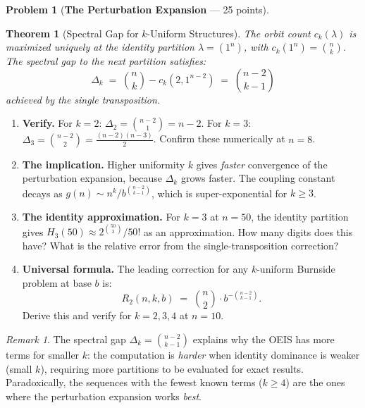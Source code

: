 \documentclass[11pt,letterpaper]{article}
\newtheorem{theorem}{Theorem}
\theoremstyle{definition}
\newtheorem{problem}{Problem}
\theoremstyle{remark}
\newtheorem*{remark}{Remark}
\begin{document}
\bigskip


\begin{problem}[\textbf{The Perturbation Expansion} --- 25 points]\label{prob:perturbation}

\begin{theorem}[Spectral Gap for $k$-Uniform Structures]\label{thm:gap-k}
The orbit count $c_k(\lambda)$ is maximized uniquely at the identity partition $\lambda = (1^n)$, with $c_k(1^n) = \binom{n}{k}$. The spectral gap to the next partition satisfies:
\[
\Delta_k \;=\; \binom{n}{k} - c_k(2, 1^{n-2}) \;=\; \binom{n-2}{k-1}
\]
achieved by the single transposition.
\end{theorem}

\begin{enumerate}[label=(\alph*)]
  \item \textbf{Verify.} For $k = 2$: $\Delta_2 = \binom{n-2}{1} = n - 2$. For $k = 3$: $\Delta_3 = \binom{n-2}{2} = \frac{(n-2)(n-3)}{2}$. Confirm these numerically at $n = 8$.

  \item \textbf{The implication.} Higher uniformity $k$ gives \emph{faster} convergence of the perturbation expansion, because $\Delta_k$ grows faster. The coupling constant decays as $g(n) \sim n^k / b^{\binom{n-2}{k-1}}$, which is super-exponential for $k \geq 3$.

  \item \textbf{The identity approximation.} For $k = 3$ at $n = 50$, the identity partition gives $H_3(50) \approx 2^{\binom{50}{3}} / 50!$ as an approximation. How many digits does this have? What is the relative error from the single-transposition correction?

  \item \textbf{Universal formula.} The leading correction for any $k$-uniform Burnside problem at base $b$ is:
  \[
  R_2(n, k, b) \;=\; \binom{n}{2} \cdot b^{-\binom{n-2}{k-1}}.
  \]
  Derive this and verify for $k = 2, 3, 4$ at $n = 10$.
\end{enumerate}

\begin{remark}
The spectral gap $\Delta_k = \binom{n-2}{k-1}$ explains why the OEIS has more terms for smaller $k$: the computation is \emph{harder} when identity dominance is weaker (small $k$), requiring more partitions to be evaluated for exact results. Paradoxically, the sequences with the fewest known terms ($k \geq 4$) are the ones where the perturbation expansion works \emph{best}.
\end{remark}
\end{problem}
\end{document}
